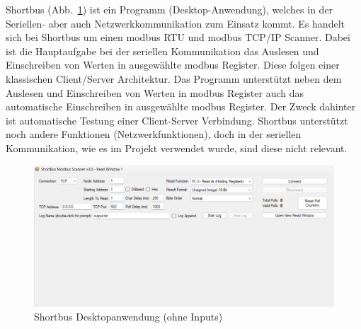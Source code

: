 Shortbus (Abb.~\ref{fig:Shortbusfenster}) ist ein Programm (Desktop-Anwendung), welches in der Seriellen- aber auch Netzwerkkommunikation zum Einsatz kommt. 
Es handelt sich bei Shortbus um einen \gls{modbus} RTU und \gls{modbus} TCP/IP Scanner.
Dabei ist die Hauptaufgabe bei der seriellen Kommunikation das Auslesen und Einschreiben von Werten in ausgewählte \gls{modbus} Register. Diese folgen einer klassischen Client/Server Architektur.
Das Programm unterstützt neben dem Auslesen und Einschreiben von Werten in \gls{modbus} Register auch das  automatische Einschreiben in ausgewählte \gls{modbus} Register. Der Zweck dahinter ist automatische Testung einer Client-Server Verbindung.
Shortbus unterstützt noch andere Funktionen (Netzwerkfunktionen), doch in der seriellen Kommunikation, wie es im Projekt verwendet wurde, sind diese nicht relevant.
\cite[vgl.][]{software.informer:2024}

\begin{figure}[H]
	\centering
	\includegraphics[width=1\linewidth]{Bilder/shortbus_fenster}
	\caption{Shortbus Desktopanwendung (ohne Inputs)} 
	\label{fig:Shortbusfenster}
\end{figure}

